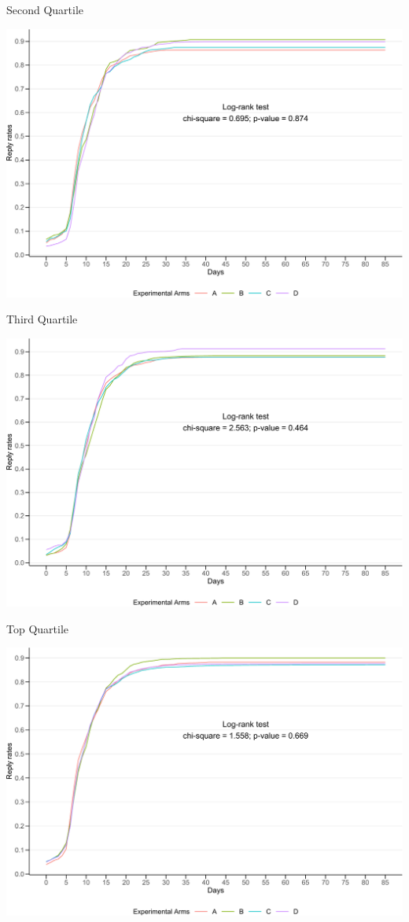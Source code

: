 \documentclass[
      aspectratio=169,
        12pt,
    ]{beamer}
\begin{document}
\begin{frame}{Second Quartile}
\protect\hypertarget{second-quartile}{}
\begin{center}\includegraphics[width=0.75\linewidth]{report_files/figure-beamer/plot-surv-2nd-1} \end{center}
\end{frame}

\begin{frame}{Third Quartile}
\protect\hypertarget{third-quartile}{}
\begin{center}\includegraphics[width=0.75\linewidth]{report_files/figure-beamer/plot-surv-3rd-1} \end{center}
\end{frame}

\begin{frame}{Top Quartile}
\protect\hypertarget{top-quartile}{}
\begin{center}\includegraphics[width=0.75\linewidth]{report_files/figure-beamer/plot-surv-top-1} \end{center}
\end{frame}
\end{document}
